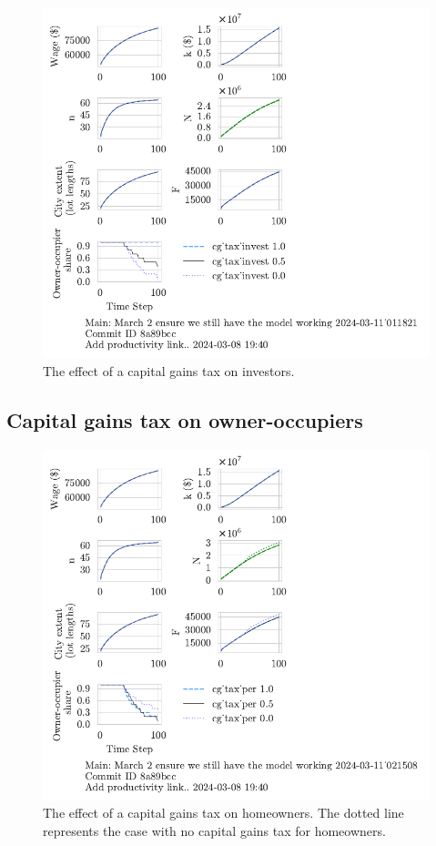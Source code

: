 \begin{figure}[b!]
    \centering
    \includegraphics[scale=1.2, trim={0 1.4cm 4cm 0},clip]{fig/cg_tax_invest-Main-011821.pdf}
    \caption{The effect of a capital gains tax on investors.}
    \label{fig:CGinvest_ownership_trajectory}
\end{figure}

\newpage

\subsection{Capital gains tax on owner-occupiers}

\begin{figure}[b!]
    \centering
    \includegraphics[scale=1.2, trim={0 1.4cm 0 0},clip]{fig/cg_tax_per-Main-021508.pdf}
    \caption{The effect of a capital gains tax on homeowners. The dotted line represents the case with no capital gains tax for homeowners.}
    \label{fig:CGpers_ownership_trajectory}
\end{figure}

